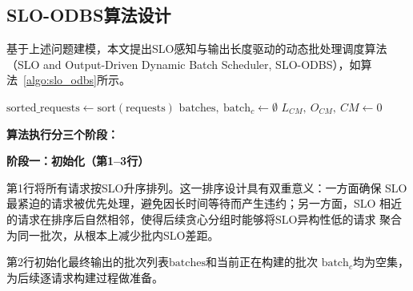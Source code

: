 \subsection{SLO-ODBS算法设计}

基于上述问题建模，本文提出SLO感知与输出长度驱动的动态批处理调度算法（SLO and Output-Driven Dynamic Batch Scheduler, SLO-ODBS），如算法~\ref{algo:slo_odbs}所示。

\begin{algorithm}[htbp]
  \caption{SLO感知与输出长度驱动的动态批处理调度算法(SLO-ODBS)}
  \label{algo:slo_odbs}
  \BlankLine
  $\text{sorted\_requests} \leftarrow \text{sort}(\text{requests})$
  $\text{batches},\ \text{batch}_c \leftarrow \emptyset$\;
  $L_{CM},\ O_{CM},\ CM \leftarrow 0$\;
  \BlankLine
  \;
\end{algorithm}


\textbf{算法执行分三个阶段：}

\textbf{阶段一：初始化（第1--3行）}

第1行将所有请求按SLO升序排列。这一排序设计具有双重意义：一方面确保
SLO最紧迫的请求被优先处理，避免因长时间等待而产生违约；另一方面，SLO
相近的请求在排序后自然相邻，使得后续贪心分组时能够将SLO异构性低的请求
聚合为同一批次，从根本上减少批内SLO差距。

第2行初始化最终输出的批次列表$\text{batches}$和当前正在构建的批次
$\text{batch}_c$均为空集，为后续逐请求构建过程做准备。

